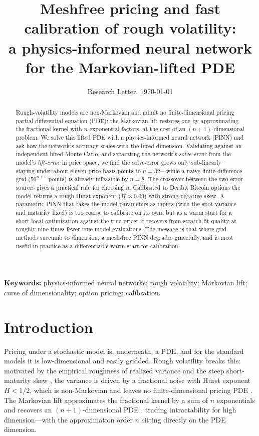 \documentclass[11pt]{article}
\title{\textbf{Meshfree pricing and fast calibration of rough volatility:\\
a physics-informed neural network for the Markovian-lifted PDE}}
\author{\todo{Authors / affiliations}}
\date{Research Letter. \today}
\begin{document}
\maketitle

\begin{abstract}
Rough-volatility models are non-Markovian and admit no finite-dimensional pricing
partial differential equation (PDE); the Markovian lift restores one by
approximating the fractional kernel with $n$ exponential factors, at the cost of
an $(n{+}1)$-dimensional problem. We solve this lifted PDE with a physics-informed
neural network (PINN) and ask how the network's accuracy scales with the lifted
dimension. Validating against an independent lifted Monte Carlo, and separating
the network's \emph{solve-error} from the model's \emph{lift-error} in price
space, we find the solve-error grows only sub-linearly---staying under about
eleven price basis points to $n{=}32$---while a naive finite-difference grid
($50^{n+1}$ points) is already infeasible by $n{=}8$. The crossover between the
two error sources gives a practical rule for choosing $n$. Calibrated to Deribit
Bitcoin options the model returns a rough Hurst exponent ($H\approx0.09$) with
strong negative skew. A parametric PINN that takes the model parameters as inputs
(with the spot variance and maturity fixed) is too coarse to calibrate on its own,
but as a warm start for a short local optimization against the true pricer it
recovers from-scratch fit quality at roughly nine times fewer true-model
evaluations. The message is that where grid methods succumb to dimension, a
mesh-free PINN degrades gracefully, and is most useful in practice as a
differentiable warm start for calibration.
\end{abstract}

\noindent\textbf{Keywords:} physics-informed neural networks; rough volatility;
Markovian lift; curse of dimensionality; option pricing; calibration.

\section{Introduction}
Pricing under a stochastic model is, underneath, a PDE, and for the standard
models it is low-dimensional and easily gridded. Rough volatility breaks this:
motivated by the empirical roughness of realized variance and the steep
short-maturity skew \citep{gatheral2018volatility,bennedsen2022decoupling}, the
variance is driven by a fractional noise with Hurst exponent $H<1/2$, which is
non-Markovian and leaves no finite-dimensional pricing PDE
\citep{eleuch2019characteristic}. The Markovian lift approximates the fractional
kernel by a sum of $n$ exponentials and recovers an $(n{+}1)$-dimensional PDE
\citep{abijaber2019multifactor,abijaber2019lifting}, trading intractability for
high dimension---with the approximation order $n$ sitting directly on the PDE
dimension.
\end{document}
